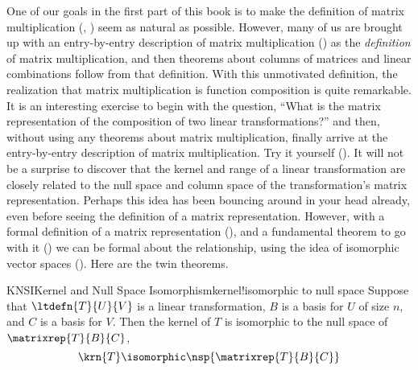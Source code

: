One of our goals in the first part of this book is to make the definition of matrix multiplication (, ) seem as natural as possible.  However, many of us are brought up with an entry-by-entry description of matrix multiplication () as the {\em definition} of matrix multiplication, and then theorems about columns of matrices and linear combinations follow from that definition.  With this unmotivated definition, the realization that matrix multiplication is function composition is quite remarkable.  It is an interesting exercise to begin with the question, ``What is the matrix representation of the composition of two linear transformations?'' and then, without using any theorems about matrix multiplication, finally arrive at the entry-by-entry description of matrix multiplication.  Try it yourself ().
%
%
%
It will not be a surprise to discover that the kernel and range of a linear transformation are closely related to the null space and column space of the transformation's matrix representation.  Perhaps this idea has been bouncing around in your head already, even before seeing the definition of a matrix representation.  However, with a formal definition of a matrix representation (), and a fundamental theorem to go with it () we can be formal about the relationship, using the idea of isomorphic vector spaces ().  Here are the twin theorems.
%
\begin{theorem}{KNSI}{Kernel and Null Space Isomorphism}{kernel!isomorphic to null space}
Suppose that $\ltdefn{T}{U}{V}$ is a linear transformation, $B$ is a basis for $U$ of size $n$, and $C$ is a basis for $V$.  Then the kernel of $T$ is isomorphic to the null space of $\matrixrep{T}{B}{C}$,
%
\begin{equation*}
\krn{T}\isomorphic\nsp{\matrixrep{T}{B}{C}}
\end{equation*}
%
\end{theorem}
%
